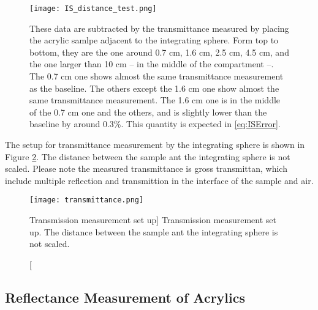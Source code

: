\begin{figure}
    \centering
    \texttt{[image: IS\_distance\_test.png]}
    \caption[Example of transmittance measured in different distance from the integrating sphere.]
{
These data are subtracted by the transmittance measured by placing the acrylic samlpe adjacent to the integrating sphere.
Form top to bottom, they are the one around 0.7 cm, 1.6 cm, 2.5 cm, 4.5 cm,
and the one larger than 10 cm -- in the middle of the compartment --. The 0.7 cm one shows almost the same transmittance measurement as the baseline.
The others except the 1.6 cm one show almost the same transmittance measurement. The 1.6 cm one is in the middle of the 0.7 cm one and the others,
and is slightly lower than the baseline by around 0.3\%. This quantity is expected in \ref{eq:ISError}.
}
    \label{fig:IS_distance_test.png}
    \end{figure}


The setup for transmittance measurement by the integrating sphere is shown in Figure \ref{fig:transmission.png}.
The distance between the sample ant the integrating sphere is not scaled. Please note the measured transmittance
is gross transmittan, which include multiple reflection and transmittion in the interface of the sample and air.


\begin{figure}
    \centering
    \texttt{[image: transmittance.png]}
    \caption
    [Transmission measurement set up]
    {Transmission measurement set up. The distance between the sample ant the integrating sphere is not scaled.}
    \label{fig:transmission.png}
    \end{figure}




\subsection{Reflectance Measurement of Acrylics}

